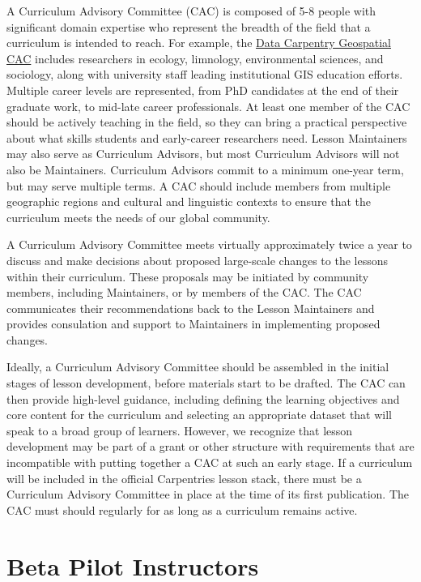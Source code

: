 \documentclass[]{book}
\begin{document}
A Curriculum Advisory Committee (CAC)
is composed of 5-8 people with significant domain expertise who represent the
breadth of the field that a curriculum is intended to reach. For example, the
\href{https://datacarpentry.org/lesson-leadership/}{Data Carpentry Geospatial CAC}
includes researchers in ecology, limnology, environmental sciences, and sociology,
along with university staff leading institutional GIS education efforts. Multiple
career levels are represented, from PhD candidates at the end of their graduate
work, to mid-late career professionals. At least one member of the CAC should
be actively teaching in the field, so they can bring a practical perspective
about what skills students and early-career researchers need. Lesson Maintainers
may also serve as Curriculum Advisors, but most Curriculum Advisors will not
also be Maintainers. Curriculum Advisors commit to a minimum one-year term, but
may serve multiple terms. A CAC should include members from multiple geographic
regions and cultural and linguistic contexts to ensure that the curriculum
meets the needs of our global community.

A Curriculum Advisory Committee meets virtually approximately twice a year to
discuss and make decisions about proposed large-scale
changes to the lessons within their curriculum. These proposals may be initiated
by community members, including Maintainers, or by members of the CAC. The CAC
communicates their recommendations back to the Lesson Maintainers and provides
consulation and support to Maintainers in implementing proposed changes.

Ideally, a Curriculum Advisory Committee should be assembled in the initial
stages of lesson development, before materials start to be drafted. The CAC
can then provide high-level guidance, including defining the learning objectives
and core content for the curriculum and selecting an appropriate dataset that
will speak to a broad group of learners. However, we recognize that lesson
development may be part of a grant or other structure with requirements that are
incompatible with putting together a CAC at such an early stage. If a curriculum
will be included in the official Carpentries lesson stack, there
must be a Curriculum Advisory Committee in place at the time of
its first publication. The CAC must should regularly for as long as a curriculum
remains active.

\hypertarget{beta-pilot-instructors}{%
\section{Beta Pilot Instructors}\label{beta-pilot-instructors}}
\end{document}
